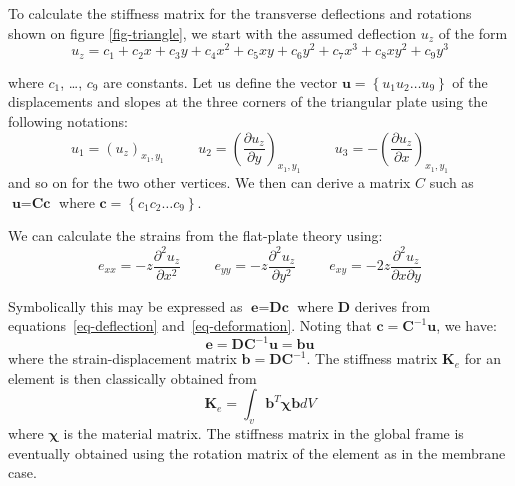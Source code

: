 \documentclass{llncs}
\begin{document}
To calculate the stiffness matrix for the transverse deflections and rotations shown on figure \ref{fig-triangle}, we start with the assumed deflection $u_z$ of the form
\begin{equation}
 u_z = c_1 + c_2x + c_3y + c_4x^2 + c_5xy + c_6y^2 + c_7x^3 + c_8xy^2 + c_9y^3
\label{eq-deflection}
\end{equation} 

where $c_1$, \ldots , $c_9$ are constants. Let us define the vector $\textbf{u} = \left\{u_1 u_2 \ldots u_9 \right\} $ of the displacements and slopes at the three corners of the triangular plate using the following notations:
\begin{equation}
u_1 = (u_z)_{x_1,y_1} \hspace{1cm} u_2 = \left(\frac{\partial u_z}{\partial y}\right)_{x_1,y_1} \hspace{1cm} u_3 = - \left(\frac{\partial u_z}{\partial x}\right)_{x_1,y_1}
\end{equation} 
and so on for the two other vertices.
We then can derive a matrix $C$ such as $\textbf{u} = \textbf{Cc}$ where $\textbf{c} = \left\{c_1 c_2 \ldots c_9 \right\} $.

We can calculate the strains from the flat-plate theory using:
\begin{equation}
\label{eq-deformation}
e_{xx} = -z \frac{\partial^2u_z}{\partial x^2}
\hspace{1cm}
e_{yy} = -z \frac{\partial^2u_z}{\partial y^2}
\hspace{1cm}
e_{xy} = -2z \frac{\partial^2u_z}{\partial x \partial y}
\end{equation} 

Symbolically this may be expressed as $\textbf{e} = \textbf{Dc}$ where $\textbf{D}$ derives from equations~\ref{eq-deflection} and~\ref{eq-deformation}. Noting that $\textbf{c} = \textbf{C}^{-1}\textbf{u}$, we have:
\begin{equation}
\textbf{e} = \textbf{DC}^{-1}\textbf{u} = \textbf{bu}
\end{equation} 
where the strain-displacement matrix $\textbf{b} = \textbf{DC}^{-1}$. 
The stiffness matrix $\textbf{K}_e$ for an element is then classically obtained from
\begin{equation}
\textbf{K}_e = \int_v \textbf{b}^{T} \boldsymbol\chi \textbf{b} dV
\end{equation} 
where $\boldsymbol\chi$ is the material matrix. The stiffness matrix in the global frame is eventually obtained using the rotation matrix of the element as in the membrane case. 
\end{document}
